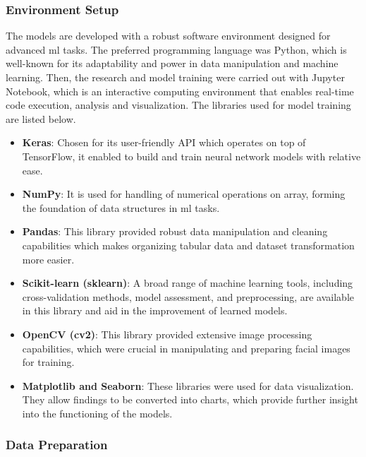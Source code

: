 \subsubsection{Environment Setup}
The models are developed with a robust software environment designed for advanced \gls{ml} tasks.
The preferred programming language was Python, which is well-known for its adaptability and power in data manipulation and machine learning.
Then, the research and model training were carried out with Jupyter Notebook, which is an interactive computing environment that enables real-time code execution, analysis and visualization.
The libraries used for model training are listed below.
\\
\begin{itemize}
    \item \textbf{Keras}: Chosen for its user-friendly API which operates on top of TensorFlow, it enabled to build and train neural network models with relative ease. 
    \item \textbf{NumPy}: It is used for handling of numerical operations on array, forming the foundation of data structures in \gls{ml} tasks. 
    \item \textbf{Pandas}: This library provided robust data manipulation and cleaning capabilities which makes organizing tabular data and dataset transformation more easier.
    \item \textbf{Scikit-learn (sklearn)}: A broad range of machine learning tools, including cross-validation methods, model assessment, and preprocessing, are available in this library and aid in the improvement of learned models. 
    \item \textbf{OpenCV (cv2)}: This library provided extensive image processing capabilities, which were crucial in manipulating and preparing facial images for training.
    \item \textbf{Matplotlib and Seaborn}: These libraries were used for data visualization. They allow findings to be converted into charts, which provide further insight into the functioning of the models.
\end{itemize}
\subsubsection{Data Preparation}
